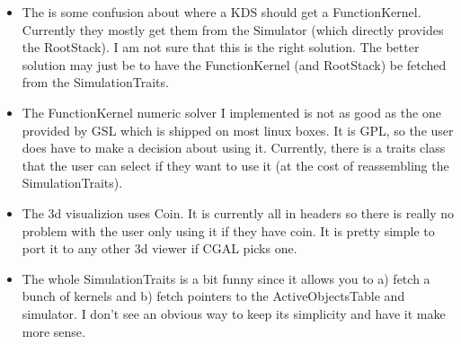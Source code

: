 \begin{itemize}
\item The is some confusion about where a KDS should get a
  FunctionKernel. Currently they mostly get them from the Simulator
  (which directly provides the RootStack). I am not sure that this is
  the right solution. The better solution may just be to have the
  FunctionKernel (and RootStack) be fetched from the SimulationTraits.

\item The FunctionKernel numeric solver I implemented is not as good
  as the one provided by GSL which is shipped on most linux boxes. It
  is GPL, so the user does have to make a decision about using it.
  Currently, there is a traits class that the user can select if they
  want to use it (at the cost of reassembling the SimulationTraits).

\item The 3d visualizion uses Coin. It is currently all in headers so
  there is really no problem with the user only using it if they have
  coin. It is pretty simple to port it to any other 3d viewer if CGAL
  picks one.

\item The whole SimulationTraits is a bit funny since it allows you to
  a) fetch a bunch of kernels and b) fetch pointers to the
  ActiveObjectsTable and simulator. I don't see an obvious way to keep
  its simplicity and have it make more sense.

\end{itemize}

